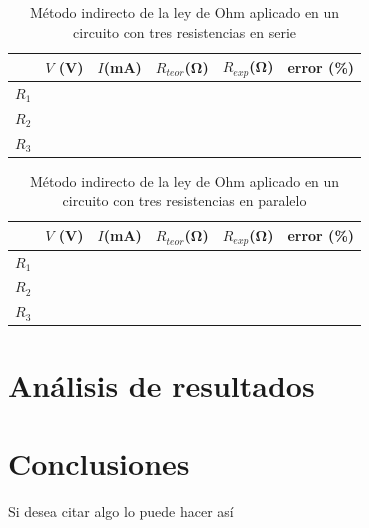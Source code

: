 \documentclass[12pt,letterpaper]{article}
\begin{document}
\begin{table}[H]
	\caption{Método indirecto de la ley de Ohm aplicado en un circuito con tres resistencias en serie}
	\label{tab:L1T3}
	\centering
	\vspace{0.5cm}
    \begin{tabularx}{14cm}{CCCCCC}
		\toprule
		& $V$ (\si{V}) & $I$(\si{\milli\ampere}) & $R_{teor}$(\si{\ohm}) & $R_{exp}$(\si{\ohm}) & error (\%)\\
		\midrule
		$R_1$ & & & & & \\
		$R_2$ & & & & & \\
		$R_3$ & & & & & \\
		\bottomrule
	\end{tabularx}
\end{table}

\begin{table}[H]
	\caption{Método indirecto de la ley de Ohm aplicado en un circuito con tres resistencias en paralelo}
	\label{tab:L1T4}
	\centering
	\vspace{0.5cm}
    \begin{tabularx}{14cm}{CCCCCC}
		\toprule
		&$V$ (\si{V}) & $I$(\si{\milli\ampere}) & $R_{teor}$(\si{\ohm}) & $R_{exp}$(\si{\ohm}) & error (\%)\\
		\midrule
		$R_1$ & & & & & \\
		$R_2$ & & & & & \\
		$R_3$ & & & & & \\
		\bottomrule
	\end{tabularx}
\end{table}

\section{Análisis de resultados}

\section{Conclusiones}

Si desea citar algo lo puede hacer así \cite{charles2013fundamentos}








\end{document}
